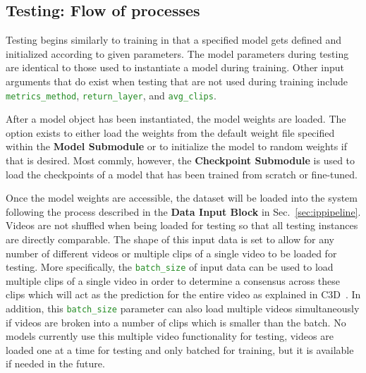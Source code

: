 \documentclass{llncs}
\begin{document}
\subsection{Testing: Flow of processes}
\label{sec:testing}

Testing begins similarly to training in that a specified model gets defined and initialized according to given parameters.
The model parameters during testing are identical to those used to instantiate a model during training.
Other input arguments that do exist when testing that are not used during training include \texttt{\textcolor{ForestGreen}{metrics\_method}}, \texttt{\textcolor{ForestGreen}{return\_layer}}, and \texttt{\textcolor{ForestGreen}{avg\_clips}}.

After a model object has been instantiated, the model weights are loaded.
The option exists to either load the weights from the default weight file specified within the \textbf{Model Submodule} or to initialize the model to random weights if that is desired.
Most commly, however, the \textbf{Checkpoint Submodule} is used to load the checkpoints of a model that has been trained from scratch or fine-tuned.

Once the model weights are accessible, the dataset will be loaded into the system following the process described in the \textbf{Data Input Block} in Sec.~\ref{sec:ippipeline}.
Videos are not shuffled when being loaded for testing so that all testing instances are directly comparable.
The shape of this input data is set to allow for any number of different videos or multiple clips of a single video to be loaded for testing.
More specifically, the \texttt{\textcolor{ForestGreen}{batch\_size}} of input data can be used to load multiple clips of a single video in order to determine a consensus across these clips which will act as the prediction for the entire video as explained in C3D~\cite{}.
In addition, this \texttt{\textcolor{ForestGreen}{batch\_size}} parameter can also load multiple videos simultaneously if videos are broken into a number of clips which is smaller than the batch.
No models currently use this multiple video functionality for testing, videos are loaded one at a time for testing and only batched for training, but it is available if needed in the future.
\end{document}
